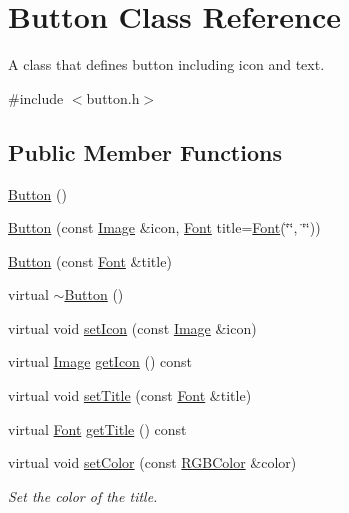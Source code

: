 \hypertarget{class_button}{}\section{Button Class Reference}
\label{class_button}


A class that defines button including icon and text.  




{\ttfamily \#include $<$button.\+h$>$}

\subsection*{Public Member Functions}
\begin{DoxyCompactItemize}
\item 
\mbox{\hyperlink{class_button_a3b36df1ae23c58aedb9e15a713159459}{Button}} ()
\item 
\mbox{\hyperlink{class_button_a0afd720661614d65ec8f59a20ba2e1d0}{Button}} (const \mbox{\hyperlink{class_image}{Image}} \&icon, \mbox{\hyperlink{class_font}{Font}} title=\mbox{\hyperlink{class_font}{Font}}(\char`\"{}\char`\"{}, \char`\"{}\char`\"{}))
\item 
\mbox{\hyperlink{class_button_aeec07db7dcdbf546a152b2056c167a4a}{Button}} (const \mbox{\hyperlink{class_font}{Font}} \&title)
\item 
virtual \mbox{\hyperlink{class_button_a2a001eb9c3cc8ae54768a850dd345002}{$\sim$\+Button}} ()
\item 
virtual void \mbox{\hyperlink{class_button_aabe6ae612c78c4e49d6c4de222e3dcb2}{set\+Icon}} (const \mbox{\hyperlink{class_image}{Image}} \&icon)
\item 
virtual \mbox{\hyperlink{class_image}{Image}} \mbox{\hyperlink{class_button_afc946623026b3f18de86af8e4cc2921e}{get\+Icon}} () const
\item 
virtual void \mbox{\hyperlink{class_button_aca4632ad68e021d147966c8782917f83}{set\+Title}} (const \mbox{\hyperlink{class_font}{Font}} \&title)
\item 
virtual \mbox{\hyperlink{class_font}{Font}} \mbox{\hyperlink{class_button_afd5d30f0dc6aba866c45072c59ee06f8}{get\+Title}} () const
\item 
virtual void \mbox{\hyperlink{class_button_a87418f0a2d9ecbff822627e4e728728e}{set\+Color}} (const \mbox{\hyperlink{class_r_g_b_color}{R\+G\+B\+Color}} \&color)
\begin{DoxyCompactList}\small\item\em Set the color of the title. \end{DoxyCompactList}\item 

\end{DoxyCompactItemize}
